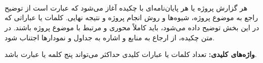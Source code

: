 \clearpage
{}
\setcounter{page}{1}
\pagestyle{plain}

\mbox{}\\



\clearpage
\mbox{}\\




\clearpage
\mbox{}\\%

\vspace{0.8cm}
\noindent
هر گزارش پروژه یا هر پایان‌نامه‌ای با چکیده آغاز می‌شود که عبارت است از توضیح راجع به موضوع پروژه، شیوه‌ها و روش انجام پروژه و نتیجه نهایی. کلمات یا عباراتی که در این بخش توضیح داده می‌شود، باید کاملاً محوری و مرتبط با موضوع پروژه باشند. در متن چکیده، از ارجاع به منابع و اشاره به جداول و نمودارها اجتناب شود.

\vspace{1cm}
\noindent\textbf{واژه‌های کلیدی:} تعداد کلمات یا عبارات کلیدی حداکثر می‌تواند پنج کلمه یا عبارت باشد.

